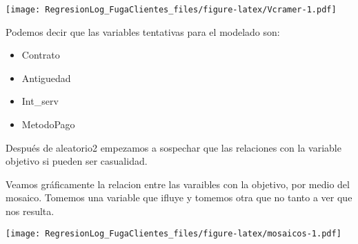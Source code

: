 \documentclass[
]{article}
\newenvironment{Shaded}{\begin{snugshade}}{\end{snugshade}}
\newcommand{\CommentTok}[1]{\textcolor[rgb]{0.56,0.35,0.01}{\textit{#1}}}
\newcommand{\FunctionTok}[1]{\textcolor[rgb]{0.00,0.00,0.00}{#1}}
\newcommand{\NormalTok}[1]{#1}
\newcommand{\OtherTok}[1]{\textcolor[rgb]{0.56,0.35,0.01}{#1}}
\newcommand{\SpecialCharTok}[1]{\textcolor[rgb]{0.00,0.00,0.00}{#1}}
\newcommand{\StringTok}[1]{\textcolor[rgb]{0.31,0.60,0.02}{#1}}
\providecommand{\tightlist}{%
  \setlength{\itemsep}{0pt}\setlength{\parskip}{0pt}}
\begin{document}
\begin{Shaded}
\end{Shaded}

\texttt{[image: RegresionLog\_FugaClientes\_files/figure-latex/Vcramer-1.pdf]}

Podemos decir que las variables tentativas para el modelado son:

\begin{itemize}
\tightlist
\item
  Contrato
\item
  Antiguedad
\item
  Int\_serv
\item
  MetodoPago
\end{itemize}

Después de aleatorio2 empezamos a sospechar que las relaciones con la
variable objetivo si pueden ser casualidad.

Veamos gráficamente la relacion entre las varaibles con la objetivo, por
medio del mosaico. Tomemos una variable que ifluye y tomemos otra que no
tanto a ver que nos resulta.

\begin{Shaded}
\end{Shaded}

\texttt{[image: RegresionLog\_FugaClientes\_files/figure-latex/mosaicos-1.pdf]}

\begin{Shaded}
\end{Shaded}
\end{document}
